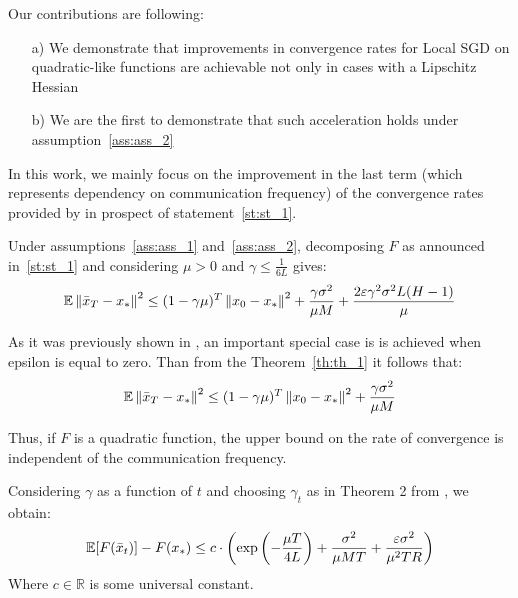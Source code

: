Our contributions are following:

\begin{itemize}
    \item[a)] We demonstrate that improvements in convergence rates for Local SGD on quadratic-like functions are achievable not only in cases with a Lipschitz Hessian
    
    \item[b)] We are the first to demonstrate that such acceleration holds under assumption~\ref{ass:ass_2}
\end{itemize}

In this work, we mainly focus on the improvement in the last term (which represents dependency on communication frequency) of the convergence rates provided by \cite{Khaled} in prospect of statement~\ref{st:st_1}.

\begin{theorem} \label{th:th_1}
    Under assumptions~\ref{ass:ass_1} and~\ref{ass:ass_2}, decomposing $F$ as announced in~\ref{st:st_1} and considering $\mu > 0$ and $\gamma \leq \frac{1}{6 L}$ gives:
    \begin{align}
        \mathbb{E} \left\|\bar{x}_T - x_*\right\|^2
        \leq
        (1 - \gamma \mu)^T \left\|x_0 - x_*\right\|^2 
        + \frac{\gamma \sigma^2}{\mu M} 
        + \frac{2 \varepsilon \gamma^2 \sigma^2 L (H-1)}{\mu}
    \end{align}
\end{theorem}

\begin{corollary} \label{}
    As it was previously shown in \cite{Woodworth}, an important special case is is achieved when epsilon is equal to zero. Than from the Theorem~\ref{th:th_1} it follows that:
    \begin{align}
        \mathbb{E} \left\|\bar{x}_T - x_*\right\|^2
        \leq
        (1 - \gamma \mu)^T \left\|x_0 - x_*\right\|^2 
        + \frac{\gamma \sigma^2}{\mu M}
    \end{align}
\end{corollary}

Thus, if $F$ is a quadratic function, the upper bound on the rate of convergence is independent of the communication frequency.

\begin{corollary} \label{}
    Considering $\gamma$ as a function of $t$ and choosing $\gamma_t$ as in Theorem 2 from \cite{Woodworth}, we obtain:
    \begin{align}
        \mathbb{E}[F(\bar{x}_t)] - F(x_*)
        \leq
        c \cdot \left(
        \text{exp} \left(-\frac{\mu T}{4 L}\right) +
        \frac{\sigma^2}{\mu MT} + \frac{\varepsilon \sigma^2}{\mu^2 TR}
        \right)
    \end{align}
    Where $c \in \mathbb{R}$ is some universal constant.
\end{corollary}




